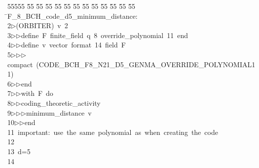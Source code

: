 %
%
\begin{tabbing}
55555 \= 55 \= 55 \= 55 \= 55 \= 55 \= 55 \= 55 \= 55 \= 55 \= 55 \= 55 \= 55 \= \>F\_8\_BCH\_code\_d5\_minimum\_distance:\\[0pt]
2\>$\triangleright$\>(ORBITER)\ v\ 2\ \\[0pt]
3\>$\triangleright$\>$\triangleright$\>define\ F\ finite\_field\ q\ 8\ override\_polynomial\ 11\ end\ \\[0pt]
4\>$\triangleright$\>$\triangleright$\>define\ v\ vector\ format\ 14\ field\ F\ \\[0pt]
5\>$\triangleright$\>$\triangleright$\>$\triangleright$\>compact\ (CODE\_BCH\_F8\_N21\_D5\_GENMA\_OVERRIDE\_POLYNOMIAL11)\ \\[0pt]
6\>$\triangleright$\>$\triangleright$\>end\ \\[0pt]
7\>$\triangleright$\>$\triangleright$\>with\ F\ do\ \\[0pt]
8\>$\triangleright$\>$\triangleright$\>coding\_theoretic\_activity\ \\[0pt]
9\>$\triangleright$\>$\triangleright$\>$\triangleright$\>minimum\_distance\ v\ \\[0pt]
10\>$\triangleright$\>$\triangleright$\>end\\[0pt]
11\>\ important:\ use\ the\ same\ polynomial\ as\ when\ creating\ the\ code\\[0pt]
12\>\\[0pt]
13\>\ d=5\\[0pt]
14\>\end{tabbing}
